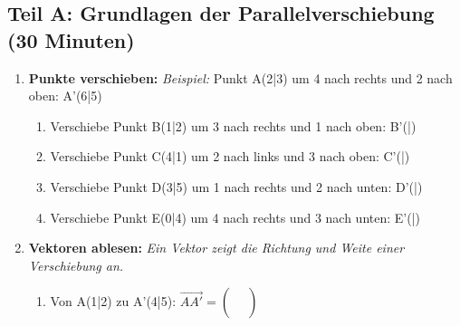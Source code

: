 \subsection*{Teil A: Grundlagen der Parallelverschiebung (30 Minuten)}

\begin{enumerate}[label=\arabic*.]

    \item \textbf{Punkte verschieben:}
    \textit{Beispiel:} Punkt A(2|3) um 4 nach rechts und 2 nach oben: A'(6|5)
    \vspace{0.5cm}

    \begin{enumerate}[label=\alph*)]
        \item Verschiebe Punkt B(1|2) um 3 nach rechts und 1 nach oben:
        B'(\underline{\hspace{1cm}}|\underline{\hspace{1cm}})
        \vspace{0.5cm}

        \item Verschiebe Punkt C(4|1) um 2 nach links und 3 nach oben:
        C'(\underline{\hspace{1cm}}|\underline{\hspace{1cm}})
        \vspace{0.5cm}

        \item Verschiebe Punkt D(3|5) um 1 nach rechts und 2 nach unten:
        D'(\underline{\hspace{1cm}}|\underline{\hspace{1cm}})
        \vspace{0.5cm}

        \item Verschiebe Punkt E(0|4) um 4 nach rechts und 3 nach unten:
        E'(\underline{\hspace{1cm}}|\underline{\hspace{1cm}})
    \end{enumerate}

    \vspace{1cm}

    \item \textbf{Vektoren ablesen:}
    \textit{Ein Vektor zeigt die Richtung und Weite einer Verschiebung an.}
    \vspace{0.5cm}

    \begin{enumerate}[label=\alph*)]
        \item Von A(1|2) zu A'(4|5): $\overrightarrow{AA'} = \begin{pmatrix} \phantom{0} \\ \phantom{0} \end{pmatrix}$
        \vspace{0.5cm}


\end{enumerate}
\end{enumerate}
